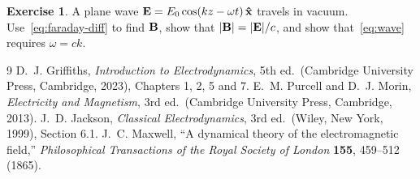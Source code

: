 \documentclass[11pt,a4paper]{article}
\theoremstyle{definition}
\newtheorem{exercise}{Exercise}
\theoremstyle{remark}
\newcommand{\E}{\vb{E}}
\newcommand{\B}{\vb{B}}
\begin{document}
\begin{exercise}
A plane wave $\E = E_0 \cos(kz - \omega t)\,\vu{x}$ travels in vacuum. Use~\eqref{eq:faraday-diff} to find $\B$, show that $|\B| = |\E|/c$, and show that~\eqref{eq:wave} requires $\omega = ck$.
\end{exercise}

\begin{thebibliography}{9}
  D.~J. Griffiths, \emph{Introduction to Electrodynamics}, 5th ed.\ (Cambridge University Press, Cambridge, 2023), Chapters 1, 2, 5 and 7.
  E.~M. Purcell and D.~J. Morin, \emph{Electricity and Magnetism}, 3rd ed.\ (Cambridge University Press, Cambridge, 2013).
  J.~D. Jackson, \emph{Classical Electrodynamics}, 3rd ed.\ (Wiley, New York, 1999), Section 6.1.
  J.~C. Maxwell, ``A dynamical theory of the electromagnetic field,'' \emph{Philosophical Transactions of the Royal Society of London} \textbf{155}, 459--512 (1865).
\end{thebibliography}
\end{document}
